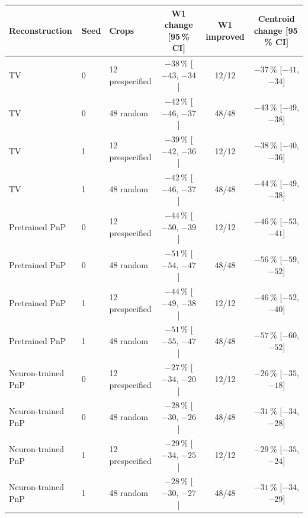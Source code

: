 \begin{tabular}{@{}lllccc@{}}
\toprule
Reconstruction & Seed & Crops & W1 change [95\,\% CI] & W1 improved & Centroid change [95\,\% CI]\\
\midrule
TV & 0 & 12 prespecified & $-38$\,\% [$-43$, $-34$] & 12/12 & $-37$\,\% [$-41$, $-34$]\\
TV & 0 & 48 random & $-42$\,\% [$-46$, $-37$] & 48/48 & $-43$\,\% [$-49$, $-38$]\\
TV & 1 & 12 prespecified & $-39$\,\% [$-42$, $-36$] & 12/12 & $-38$\,\% [$-40$, $-36$]\\
TV & 1 & 48 random & $-42$\,\% [$-46$, $-37$] & 48/48 & $-44$\,\% [$-49$, $-38$]\\
Pretrained PnP & 0 & 12 prespecified & $-44$\,\% [$-50$, $-39$] & 12/12 & $-46$\,\% [$-53$, $-41$]\\
Pretrained PnP & 0 & 48 random & $-51$\,\% [$-54$, $-47$] & 48/48 & $-56$\,\% [$-59$, $-52$]\\
Pretrained PnP & 1 & 12 prespecified & $-44$\,\% [$-49$, $-38$] & 12/12 & $-46$\,\% [$-52$, $-40$]\\
Pretrained PnP & 1 & 48 random & $-51$\,\% [$-55$, $-47$] & 48/48 & $-57$\,\% [$-60$, $-52$]\\
Neuron-trained PnP & 0 & 12 prespecified & $-27$\,\% [$-34$, $-20$] & 12/12 & $-26$\,\% [$-35$, $-18$]\\
Neuron-trained PnP & 0 & 48 random & $-28$\,\% [$-30$, $-26$] & 48/48 & $-31$\,\% [$-34$, $-28$]\\
Neuron-trained PnP & 1 & 12 prespecified & $-29$\,\% [$-34$, $-25$] & 12/12 & $-29$\,\% [$-35$, $-24$]\\
Neuron-trained PnP & 1 & 48 random & $-28$\,\% [$-30$, $-27$] & 48/48 & $-31$\,\% [$-34$, $-29$]\\
\bottomrule
\end{tabular}

